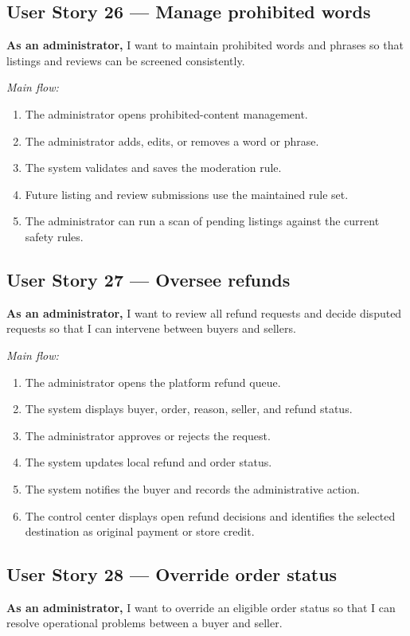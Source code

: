 \documentclass[11pt]{scrreprt}
\begin{document}
\subsection{User Story 26 --- Manage prohibited words}
\textbf{As an administrator,} I want to maintain prohibited words and phrases
so that listings and reviews can be screened consistently.

\textit{Main flow:}
\begin{enumerate}
\item The administrator opens prohibited-content management.
\item The administrator adds, edits, or removes a word or phrase.
\item The system validates and saves the moderation rule.
\item Future listing and review submissions use the maintained rule set.
\item The administrator can run a scan of pending listings against the
current safety rules.
\end{enumerate}

\subsection{User Story 27 --- Oversee refunds}
\textbf{As an administrator,} I want to review all refund requests and decide
disputed requests so that I can intervene between buyers and sellers.

\textit{Main flow:}
\begin{enumerate}
\item The administrator opens the platform refund queue.
\item The system displays buyer, order, reason, seller, and refund status.
\item The administrator approves or rejects the request.
\item The system updates local refund and order status.
\item The system notifies the buyer and records the administrative action.
\item The control center displays open refund decisions and identifies the
selected destination as original payment or store credit.
\end{enumerate}

\subsection{User Story 28 --- Override order status}
\textbf{As an administrator,} I want to override an eligible order status so
that I can resolve operational problems between a buyer and seller.
\end{document}
